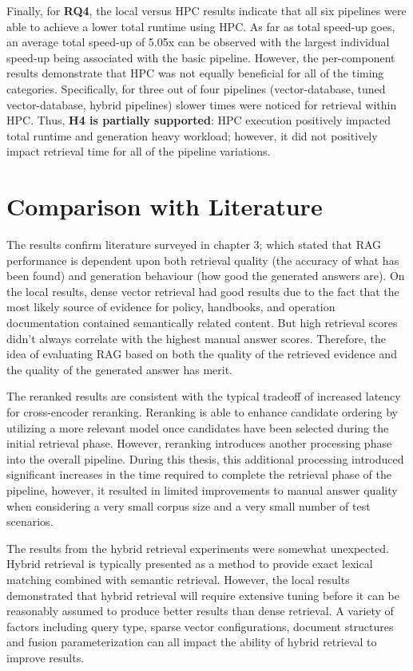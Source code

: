 Finally, for \textbf{RQ4}, the local versus HPC results indicate that all six pipelines were able to achieve a lower total runtime using \ac{HPC}. As far as total speed-up goes, an average total speed-up of 5.05x can be observed with the largest individual speed-up being associated with the basic pipeline. However, the per-component results demonstrate that \ac{HPC} was not equally beneficial for all of the timing categories. Specifically, for three out of four pipelines (vector-database, tuned vector-database, hybrid pipelines) slower times were noticed for retrieval within HPC. Thus, \textbf{H4 is partially supported}: HPC execution positively impacted total runtime and generation heavy workload; however, it did not positively impact retrieval time for all of the pipeline variations.

\section{Comparison with Literature}

The results confirm literature surveyed in chapter 3; which stated that \ac{RAG} performance is dependent upon both retrieval quality (the accuracy of what has been found) and generation behaviour (how good the generated answers are). On the local results, dense vector retrieval had good results due to the fact that the most likely source of evidence for policy, handbooks, and operation documentation contained semantically related content. But high retrieval scores didn't always correlate with the highest manual answer scores. Therefore, the idea of evaluating \ac{RAG} based on both the quality of the retrieved evidence and the quality of the generated answer has merit.

The reranked results are consistent with the typical tradeoff of increased latency for cross-encoder reranking. Reranking is able to enhance candidate ordering by utilizing a more relevant model once candidates have been selected during the initial retrieval phase. However, reranking introduces another processing phase into the overall pipeline. During this thesis, this additional processing introduced significant increases in the time required to complete the retrieval phase of the pipeline, however, it resulted in limited improvements to manual answer quality when considering a very small corpus size and a very small number of test scenarios.

The results from the hybrid retrieval experiments were somewhat unexpected. Hybrid retrieval is typically presented as a method to provide exact lexical matching combined with semantic retrieval. However, the local results demonstrated that hybrid retrieval will require extensive tuning before it can be reasonably assumed to produce better results than dense retrieval. A variety of factors including query type, sparse vector configurations, document structures and fusion parameterization can all impact the ability of hybrid retrieval to improve results.


